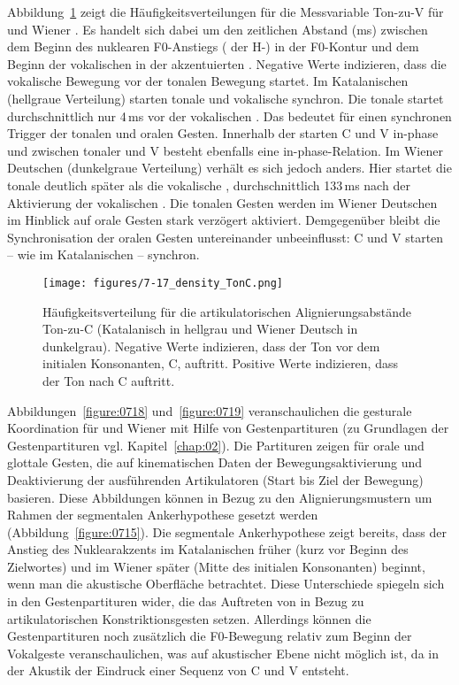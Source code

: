 \clearpage 

Abbildung~\ref{figure:0717} zeigt die Häufigkeitsverteilungen für die Messvariable Ton-zu-V für  und Wiener . Es handelt sich dabei um den zeitlichen Abstand (ms) zwischen dem Beginn des nuklearen F0-Anstiegs ( der H-) in der F0-Kontur und dem Beginn der vokalischen  in der akzentuierten . Negative Werte indizieren, dass die vokalische Bewegung vor der tonalen Bewegung startet. Im Katalanischen (hellgraue Verteilung) starten tonale und vokalische  synchron. Die tonale  startet durchschnittlich nur 4\,ms vor der vokalischen . Das bedeutet für  einen synchronen Trigger der tonalen und oralen Gesten. Innerhalb der  starten C und V in-phase und zwischen tonaler  und V besteht ebenfalls eine in-phase-Relation. Im Wiener Deutschen (dunkelgraue Verteilung) verhält es sich jedoch anders. Hier startet die tonale  deutlich später als die vokalische , durchschnittlich 133\,ms nach der Aktivierung der vokalischen . Die tonalen Gesten werden im Wiener Deutschen im Hinblick auf orale Gesten stark verzögert aktiviert. Demgegenüber bleibt die Synchronisation der oralen Gesten untereinander unbeeinflusst: C und V starten -- wie im Katalanischen -- synchron.

\begin{figure}[p]
	\texttt{[image: figures/7-17\_density\_TonC.png]}
	\caption{Häufigkeitsverteilung für die artikulatorischen Alignierungsabstände Ton-zu-C (Katalanisch in hellgrau und Wiener Deutsch in dunkelgrau). Negative Werte indizieren, dass der Ton vor dem initialen Konsonanten, C, auftritt. Positive Werte indizieren, dass der Ton nach C auftritt.}
	\label{figure:0717}
\end{figure}


Abbildungen~\ref{figure:0718} und~\ref{figure:0719} veranschaulichen die gesturale Koordination für  und Wiener  mit Hilfe von Gestenpartituren (zu Grundlagen der Gestenpartituren vgl. Kapitel~\ref{chap:02}). Die Partituren zeigen  für orale und glottale Gesten, die auf kinematischen Daten der Bewegungsaktivierung und Deaktivierung der ausführenden Artikulatoren (Start bis Ziel der Bewegung) basieren. Diese Abbildungen können in Bezug zu den Alignierungsmustern um Rahmen der segmentalen Ankerhypothese gesetzt werden (Abbildung~\ref{figure:0715}). Die segmentale Ankerhypothese zeigt bereits, dass der Anstieg des Nuklearakzents im Katalanischen früher (kurz vor Beginn des Zielwortes) und im Wiener  später (Mitte des initialen Konsonanten) beginnt, wenn man die akustische Oberfläche betrachtet. Diese Unterschiede spiegeln sich in den Gestenpartituren wider, die das Auftreten von  in Bezug zu artikulatorischen Konstriktionsgesten setzen. Allerdings können die Gestenpartituren noch zusätzlich die F0-Bewegung relativ zum Beginn der Vokalgeste veranschaulichen, was auf akustischer Ebene nicht möglich ist, da in der Akustik der Eindruck einer Sequenz von C und V entsteht.

